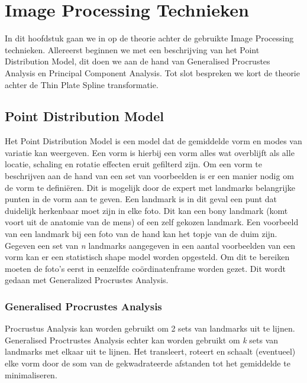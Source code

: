 \section{Image Processing Technieken}
\label{Image Processing Technieken}
In dit hoofdstuk gaan we in op de theorie achter de gebruikte Image Processing technieken. 
Allereerst beginnen we met een beschrijving van het Point Distribution Model, dit doen we aan de hand van Generalised Procrustes Analysis en Principal Component Analysis. 
Tot slot bespreken we kort de theorie achter de Thin Plate Spline transformatie. 

\subsection{Point Distribution Model}
Het Point Distribution Model is een model dat de gemiddelde vorm en modes van variatie kan weergeven.\cite{PDM} 
Een vorm is hierbij een vorm alles wat overblijft als alle locatie, schaling en rotatie effecten eruit gefilterd zijn.\cite{gpa}
Om een vorm te beschrijven aan de hand van een set van voorbeelden is er een manier nodig om de vorm te defini\"{e}ren. 
Dit is mogelijk door de expert met landmarks belangrijke punten in de vorm aan te geven. 
Een landmark is in dit geval een punt dat duidelijk herkenbaar moet zijn in elke foto. 
Dit kan een bony landmark (komt voort uit de anatomie van de mens) of een zelf gekozen landmark. Een voorbeeld van een landmark bij een foto van de hand kan het topje van de duim zijn. 
Gegeven een set van \textit{n} landmarks aangegeven in een aantal voorbeelden van een vorm kan er een statistisch shape model worden opgesteld. 
Om dit te bereiken moeten de foto's eerst in eenzelfde co\"{o}rdinatenframe worden gezet. Dit wordt gedaan met Generalized Procrustes Analysis.

\subsubsection{Generalised Procrustes Analysis}
Procrustus Analysis kan worden gebruikt om 2 sets van landmarks uit te lijnen. Generalised Proctrustes Analysis echter kan worden gebruikt om \textit{k} sets van landmarks met elkaar uit te lijnen. 
Het transleert, roteert en schaalt (eventueel) elke vorm door de som van de gekwadrateerde afstanden tot het gemiddelde te minimaliseren. 

